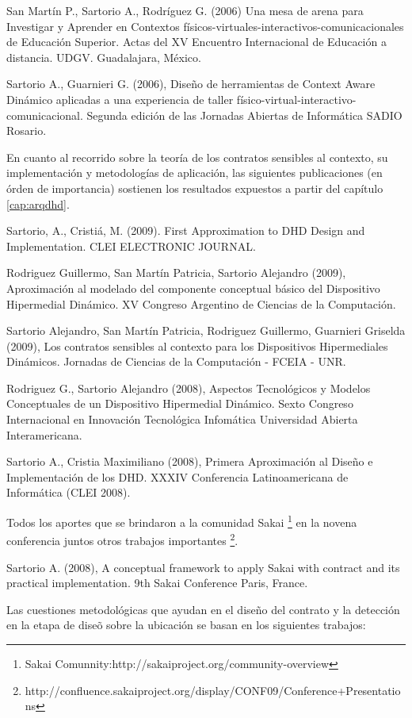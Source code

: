 {San Martín P., Sartorio A., Rodríguez G. (2006) Una mesa de arena para
Investigar y Aprender en Contextos
físicos-virtuales-interactivos-comunicacionales de Educación Superior. Actas del
XV Encuentro Internacional de Educación a distancia. UDGV. Guadalajara, México.

Sartorio A., Guarnieri G. (2006), Diseño de herramientas de Context
Aware Dinámico aplicadas a una experiencia de
taller físico-virtual-interactivo-comunicacional. Segunda edición de las
Jornadas Abiertas de Informática SADIO Rosario.

En cuanto al recorrido sobre la teoría de los contratos sensibles al contexto,
su implementación y metodologías de aplicación, las siguientes
publicaciones (en órden de importancia) sostienen los resultados expuestos a
partir del capítulo \ref{cap:arqdhd}.

Sartorio, A., Cristiá, M. (2009). First Approximation to
DHD Design and Implementation. CLEI ELECTRONIC JOURNAL.

Rodriguez Guillermo, San Martín Patricia, Sartorio Alejandro (2009),
Aproximación al modelado del componente conceptual básico del Dispositivo
Hipermedial Dinámico. XV Congreso Argentino de Ciencias de la Computación.  

Sartorio Alejandro, San Martín Patricia,  Rodriguez Guillermo, Guarnieri
Griselda (2009),  Los contratos sensibles al contexto para los Dispositivos
Hipermediales Dinámicos. Jornadas de Ciencias de la Computación - FCEIA - UNR.

Rodriguez G., Sartorio Alejandro (2008),  Aspectos Tecnológicos y Modelos
Conceptuales de un Dispositivo Hipermedial Dinámico. Sexto Congreso
Internacional en Innovación Tecnológica Infomática Universidad Abierta
Interamericana.

Sartorio A., Cristia Maximiliano (2008),  Primera Aproximación al Diseño
e Implementación de los DHD.   XXXIV Conferencia Latinoamericana de Informática
(CLEI 2008).


Todos los aportes que se brindaron a la comunidad Sakai \footnote{Sakai
Comunnity:http://sakaiproject.org/community-overview} en la novena conferencia
juntos otros trabajos importantes
\footnote{
http://confluence.sakaiproject.org/display/CONF09/Conference+Presentations}. 

Sartorio A. (2008),  A conceptual framework  to apply Sakai with contract
and its practical implementation. 9th Sakai Conference Paris, France.


Las cuestiones metodológicas que ayudan en el diseño del contrato y la
detección en la etapa de dise\~o sobre la ubicación se basan en los
siguientes trabajos:

}
